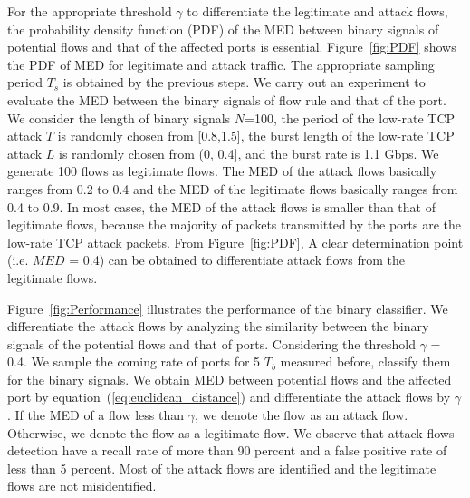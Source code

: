 For the appropriate threshold $\gamma$ to differentiate the legitimate and attack flows, the probability density function (PDF) of the MED between binary signals of potential flows and that of the affected ports is essential. Figure~\ref{fig:PDF} shows the PDF of MED for legitimate and attack traffic. The appropriate sampling period $T_s$ is obtained by the previous steps. We carry out an experiment to evaluate the MED between the binary signals of flow rule and that of the port. 
We consider the length of binary signals $N$=100, the period of the low-rate TCP attack $T$ is randomly chosen from [0.8,1.5], the burst length of the low-rate TCP attack $L$ is randomly chosen from (0, 0.4], and the burst rate is 1.1 Gbps. We generate 100 flows as legitimate flows. The MED of the attack flows basically ranges from 0.2 to 0.4 and the MED of the legitimate flows basically ranges from 0.4 to 0.9. In most cases, the MED of the attack flows is smaller than that of legitimate flows, because the majority of packets transmitted by the ports are the low-rate TCP attack packets. From Figure~\ref{fig:PDF}, A clear determination point (i.e. $MED$ = 0.4) can be obtained to differentiate attack flows from the legitimate flows.


Figure~\ref{fig:Performance} illustrates the performance of the binary classifier. We differentiate the attack flows by analyzing the similarity between the binary signals of the potential flows and that of ports. Considering the threshold $\gamma$ = 0.4. We sample the coming rate of ports for 5 $T_b$ measured before, classify them for the binary signals. We obtain MED between potential flows and the affected port by equation~(\ref{eq:euclidean_distance}) and differentiate the attack flows by $\gamma$. If the MED of a flow less than $\gamma$, we denote the flow as an attack flow. Otherwise, we denote the flow as a legitimate flow. We observe that attack flows detection have a recall rate of more than 90 percent and a false positive rate of less than 5 percent. Most of the attack flows are identified and the legitimate flows are not misidentified.


